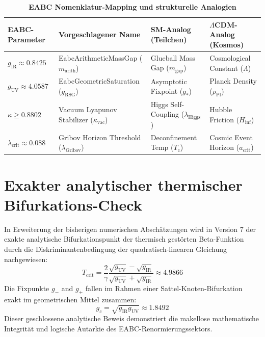\documentclass[11pt,a4paper]{article}
\begin{document}
	\begin{table}[h!]
		\centering
		\caption{\textbf{EABC Nomenklatur-Mapping und strukturelle Analogien}}
		\vspace{0.2cm}
		\begin{tabular}{llll}
			\toprule
			\textbf{EABC-Parameter} & \textbf{Vorgeschlagener Name} & \textbf{SM-Analog (Teilchen)} & \textbf{$\Lambda$CDM-Analog (Kosmos)} \\
			\midrule
			$g_{\text{IR}} \approx 0.8425$ & EabcArithmeticMassGap ($m_{\text{arith}}$) & Glueball Mass Gap ($m_{\text{gap}}$) & Cosmological Constant ($\Lambda$) \\
			$g_{\text{UV}} \approx 4.0587$ & EabcGeometricSaturation ($g_{\text{RSG}}$) & Asymptotic Fixpoint ($g_*$) & Planck Density ($\rho_{\text{Pl}}$) \\
			$\kappa \ge 0.8802$ & Vacuum Lyapunov Stabilizer ($\kappa_{\text{vac}}$) & Higgs Self-Coupling ($\lambda_{\text{Higgs}}$) & Hubble Friction ($H_{\text{inf}}$) \\
			$\lambda_{\text{crit}} \approx 0.088$ & Gribov Horizon Threshold ($\lambda_{\text{Gribov}}$) & Deconfinement Temp ($T_{\text{c}}$) & Cosmic Event Horizon ($a_{\text{crit}}$) \\
			\bottomrule
		\end{tabular}
	\end{table}
	
	\section{Exakter analytischer thermischer Bifurkations-Check}
	In Erweiterung der bisherigen numerischen Abschätzungen wird in Version 7 der exakte analytische Bifurkationspunkt der thermisch gestörten Beta-Funktion durch die Diskriminantenbedingung der quadratisch-linearen Gleichung nachgewiesen:
	\begin{equation}
		T_{\text{crit}} = \frac{2}{\gamma} \frac{\sqrt{g_{\text{UV}}} - \sqrt{g_{\text{IR}}}}{\sqrt{g_{\text{UV}}} + \sqrt{g_{\text{IR}}}} \approx 4.9866
	\end{equation}
	Die Fixpunkte $g_-$ and $g_+$ fallen im Rahmen einer Sattel-Knoten-Bifurkation exakt im geometrischen Mittel zusammen:
	\begin{equation}
		g_c = \sqrt{g_{\text{IR}} g_{\text{UV}}} \approx 1.8492
	\end{equation}
	Dieser geschlossene analytische Beweis demonstriert die makellose mathematische Integrität und logische Autarkie des EABC-Renormierungssektors.
	
\end{document}
